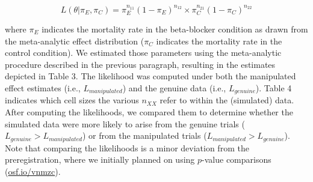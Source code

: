 \documentclass[]{article}
\begin{document}
\begin{equation}
\label{eq1}
L(\theta|\pi_{E},\pi_{C})=\pi_{E}^{n_{11}}(1-\pi_{E})^{n_{12}} \times \pi_{C}^{n_{21}}(1 - \pi_{C})^{n_{22}}
\end{equation}

where \(\pi_{E}\) indicates the mortality rate in the beta-blocker
condition as drawn from the meta-analytic effect distribution
(\(\pi_{C}\) indicates the mortality rate in the control condition). We
estimated those parameters using the meta-analytic procedure described
in the previous paragraph, resulting in the estimates depicted in Table
3. The likelihood was computed under both the manipulated effect
estimates (i.e., \(L_{manipulated}\)) and the genuine data (i.e.,
\(L_{genuine}\)). Table 4 indicates which cell sizes the various
\(n_{XX}\) refer to within the (simulated) data. After computing the
likelihoods, we compared them to determine whether the simulated data
were more likely to arise from the genuine trials
(\(L_{genuine}>L_{manipulated}\)) or from the manipulated trials
(\(L_{manipulated}>L_{genuine}\)). Note that comparing the likelihoods
is a minor deviation from the preregistration, where we initially
planned on using \(p\)-value comparisons
(\href{https://osf.io/vnmzc}{osf.io/vnmzc}).
\end{document}
